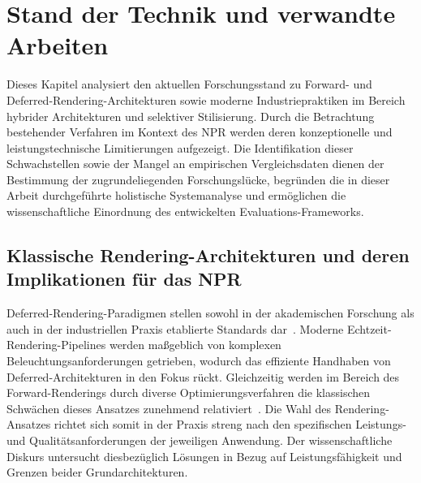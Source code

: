 \chapter{Stand der Technik und verwandte Arbeiten}
\label{ch:03_acedemic_and_industry_state}

Dieses Kapitel analysiert den aktuellen Forschungsstand zu Forward- und Deferred-Ren\-der\-ing\--Ar\-chi\-tek\-tu\-ren
sowie moderne Industriepraktiken im Bereich hybrider Architekturen und selektiver Stilisierung.
Durch die Betrachtung bestehender Verfahren im Kontext des \ac{NPR} werden deren konzeptionelle und leistungstechnische
Limitierungen aufgezeigt.
Die Identifikation dieser Schwachstellen sowie der Mangel an empirischen Vergleichsdaten dienen der Bestimmung der
zugrundeliegenden Forschungslücke, begründen die in dieser Arbeit durchgeführte holistische Systemanalyse und
ermöglichen die wissenschaftliche Einordnung des entwickelten Evaluations-Frameworks.


\section{Klassische Rendering-Architekturen und deren Implikationen für das NPR}
\label{sec:0301_academic_state}

Deferred-Rendering-Paradigmen stellen sowohl in der akademischen Forschung als auch in der industriellen Praxis
etablierte Standards dar~\parencite[vgl.][S.~2]{mallettDeferredAdaptiveCompute2018}.
Moderne Echtzeit-Rendering-Pipelines werden maßgeblich von komplexen Beleuchtungsanforderungen getrieben, wodurch das
effiziente Handhaben von Deferred-Architekturen in den Fokus rückt.
Gleichzeitig werden im Bereich des Forward-Renderings durch diverse Optimierungsverfahren die klassischen Schwächen
dieses Ansatzes zunehmend relativiert~\parencite[vgl.][]{olssonClusteredDeferredForward2012, haradaForwardBringingDeferred2012}.
Die Wahl des Rendering-Ansatzes richtet sich somit in der Praxis streng nach den spezifischen Leistungs- und
Qualitätsanforderungen der jeweiligen Anwendung.
Der wissenschaftliche Diskurs untersucht diesbezüglich Lösungen in Bezug auf Leistungsfähigkeit und Grenzen beider
Grundarchitekturen.

